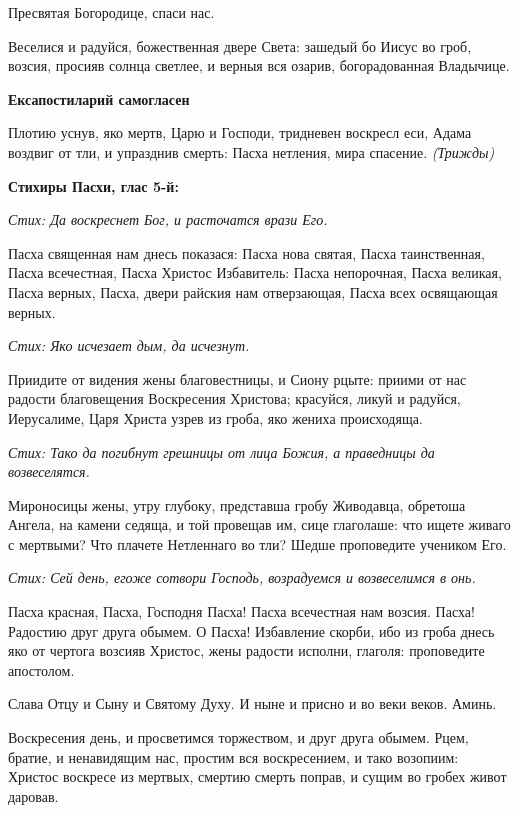 Пресвятая Богородице, спаси нас.


Веселися и радуйся, божественная двере Света: зашедый бо Иисус во гроб, возсия, просияв солнца светлее, и верныя вся озарив, богорадованная Владычице.





\bfseries Ексапостиларий самогласен\normalfont{}


Плотию уснув, яко мертв, Царю и Господи, тридневен воскресл еси, Адама воздвиг от тли, и упразднив смерть: Пасха нетления, мира спасение. \itshape (Трижды)\normalfont{}





\bfseries Стихиры Пасхи, глас 5-й:\normalfont{}


\itshape Стих:\normalfont{} Да воскреснет Бог, и расточатся врази Его.


Пасха священная нам днесь показася: Пасха нова святая, Пасха таинственная, Пасха всечестная, Пасха Христос Избавитель: Пасха непорочная, Пасха великая, Пасха верных, Пасха, двери райския нам отверзающая, Пасха всех освящающая верных.


\itshape Стих:\normalfont{} Яко исчезает дым, да исчезнут.


Приидите от видения жены благовестницы, и Сиону рцыте: приими от нас радости благовещения Воскресения Христова; красуйся, ликуй и радуйся, Иерусалиме, Царя Христа узрев из гроба, яко жениха происходяща.


\itshape Стих:\normalfont{} Тако да погибнут грешницы от лица Божия, а праведницы да возвеселятся.


Мироносицы жены, утру глубоку, представша гробу Живодавца, обретоша Ангела, на камени седяща, и той провещав им, сице глаголаше: что ищете живаго с мертвыми? Что плачете Нетленнаго во тли? Шедше проповедите учеником Его.


\itshape Стих:\normalfont{} Сей день, егоже сотвори Господь, возрадуемся и возвеселимся в онь.


Пасха красная, Пасха, Господня Пасха! Пасха всечестная нам возсия. Пасха! Радостию друг друга обымем. О Пасха! Избавление скорби, ибо из гроба днесь яко от чертога возсияв Христос, жены радости исполни, глаголя: проповедите апостолом.


Слава Отцу и Сыну и Святому Духу. И ныне и присно и во веки веков. Аминь.


Воскресения день, и просветимся торжеством, и друг друга обымем. Рцем, братие, и ненавидящим нас, простим вся воскресением, и тако возопиим: Христос воскресе из мертвых, смертию смерть поправ, и сущим во гробех живот даровав.





